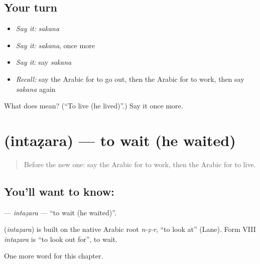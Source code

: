 \subsection*{Your turn}
\begin{itemize}
\raggedright
  \item \emph{Say it:} \emph{sakana}
  \item \emph{Say it:} \emph{sakana}, once more
  \item \emph{Say it:} say \emph{sakana}
  \item \emph{Recall:} say the Arabic for to go out, then the Arabic for to work, then say \emph{sakana} again
\end{itemize}

\begin{tcolorbox}[breakable,colback=teal!4,colframe=teal!35!black,title={Before you move on}]
What does  mean? (\textquotedblleft{}To live (he lived)\textquotedblright{}.) Say it once more.
\end{tcolorbox}
\section[\texorpdfstring{\ar{انتظر} (intaẓara)}{انتظر (intaẓara)}]{ (intaẓara) — to wait (he waited)}

\label{lesson:AR-C64-intazara}



\begin{quote}
Before the new one: say the Arabic for to work, then the Arabic for to live.
\end{quote}

\subsection*{You'll want to know: }
\textbf{} — \emph{intaẓara} — \textquotedblleft{}to wait (he waited)\textquotedblright{}.

\begin{cousinweb}
\textbf{} (\emph{intaẓara}) is built on the native Arabic root \emph{n-ẓ-r}, \textquotedblleft{}to look at\textquotedblright{} (Lane). Form VIII \emph{intaẓara} is \textquotedblleft{}to look out for\textquotedblright{}, to wait.
\end{cousinweb}

\begin{grammarlens}[title={What you've built}]
One more word for this chapter.
\end{grammarlens}

